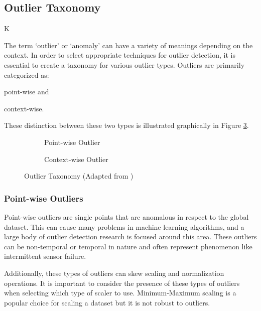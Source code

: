\subsection{Outlier Taxonomy}K

The term `outlier' or `anomaly' can have a variety of meanings depending on the context. In order to select appropriate techniques for outlier detection, it is essential to create a taxonomy for various outlier types. Outliers are primarily categorized as:
\begin{inlinelist}
    \item point-wise and
    \item context-wise.
\end{inlinelist}
These distinction between these two types is illustrated graphically in Figure \ref{fig:outliers-graphic}.

\begin{figure}[H]
     \centering
     \begin{subfigure}[b]{0.475\textwidth}
         \centering
         {\resizebox{\textwidth}{!}{}}
         \caption{Point-wise Outlier}
         \label{fig:point}
     \end{subfigure}
     \hfill
     \begin{subfigure}[b]{0.475\textwidth}
         \centering
          {\resizebox{\textwidth}{!}{}}
         \caption{Context-wise Outlier}
         \label{fig:contextual}
     \end{subfigure}
        \caption{Outlier Taxonomy (Adapted from \cite{lai2021revisiting})}
        \label{fig:outliers-graphic}
\end{figure}

\subsubsection{Point-wise Outliers}

Point-wise outliers are single points that are anomalous in respect to the global dataset.
This can cause many problems in machine learning algorithms, and a large body of outlier detection research is focused around this area.
These outliers can be non-temporal or temporal in nature and often represent phenomenon like intermittent sensor failure.

Additionally, these types of outliers can skew scaling and normalization operations.
It is important to consider the presence of these types of outliers when selecting which type of scaler to use.
Minimum-Maximum scaling is a popular choice for scaling a dataset but it is not robust to outliers.


